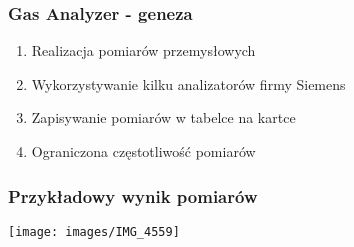 \documentclass[ucs]{beamer}
\begin{document}

\begin{frame}
\frametitle{Gas Analyzer - geneza}
\begin{enumerate}
\setlength{\itemsep}{5pt}
\setlength{\parskip}{5pt}
\setlength{\parsep}{5pt}
\item Realizacja pomiarów przemysłowych
\item Wykorzystywanie kilku analizatorów firmy Siemens
\item Zapisywanie pomiarów w tabelce na kartce
\item Ograniczona częstotliwość pomiarów
\end{enumerate}
\end{frame}

\begin{frame}
\frametitle{Przykładowy wynik pomiarów}
\begin{center}
\texttt{[image: images/IMG\_4559]}
\end{center}
\end{frame}
\end{document}
